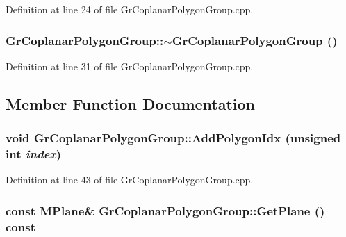 Definition at line 24 of file GrCoplanarPolygonGroup.cpp.\hypertarget{class_gr_coplanar_polygon_group_8d147d335f0e5ffb552ffc38496fcc4c}{
\subsubsection[{$\sim$GrCoplanarPolygonGroup}]{\setlength{\rightskip}{0pt plus 5cm}GrCoplanarPolygonGroup::$\sim$GrCoplanarPolygonGroup ()}}
\label{class_gr_coplanar_polygon_group_8d147d335f0e5ffb552ffc38496fcc4c}




Definition at line 31 of file GrCoplanarPolygonGroup.cpp.

\subsection{Member Function Documentation}
\hypertarget{class_gr_coplanar_polygon_group_59f43d1f94bc7755747fd6041f0de79e}{
\subsubsection[{AddPolygonIdx}]{\setlength{\rightskip}{0pt plus 5cm}void GrCoplanarPolygonGroup::AddPolygonIdx (unsigned int {\em index})}}
\label{class_gr_coplanar_polygon_group_59f43d1f94bc7755747fd6041f0de79e}




Definition at line 43 of file GrCoplanarPolygonGroup.cpp.\hypertarget{class_gr_coplanar_polygon_group_e7ff3b0740353c8f2374155c9731676e}{
\subsubsection[{GetPlane}]{\setlength{\rightskip}{0pt plus 5cm}const {\bf MPlane}\& GrCoplanarPolygonGroup::GetPlane () const}}
\label{class_gr_coplanar_polygon_group_e7ff3b0740353c8f2374155c9731676e}




